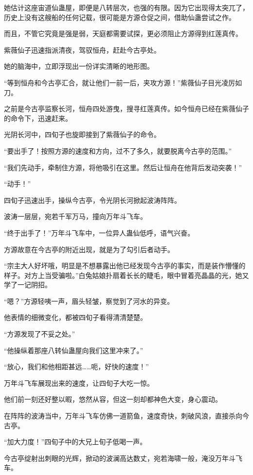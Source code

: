 \begin{this_body}
她估计这座宙道仙蛊屋，即便是八转层次，也强的有限。因为它出现得太突兀了，历史上没有这艘船的任何记载，很可能是方源仓促之间，借助仙蛊尝试之作。

而且，不管它究竟是强是弱，天庭都需要试探，更必须阻止方源得到红莲真传。

紫薇仙子迅速指派清夜，驾驭恒舟，赶赴今古亭处。

她的脑海中，立即浮现出一份详实清晰的地形图。

“等到恒舟和今古亭汇合，就让他们一前一后，夹攻方源！”紫薇仙子目光凌厉如刀。

之前是今古亭监察长河，恒舟四处游曳，搜寻红莲真传。如今恒舟已经在紫薇仙子的命令下，迅速赶来。

光阴长河中，四旬子也旋即接到了紫薇仙子的命令。

“要出手了！按照方源的速度和方向，过不了多久，就要脱离今古亭的范围。”

“我们先动手，牵制住方源，将他吸引在这里。然后让恒舟在他背后发动突袭！”

“动手！”

四旬子迅速出手，操纵今古亭，令光阴长河掀起波涛阵阵。

波涛一层层，宛若千军万马，撞向万年斗飞车。

“终于出手了！”万年斗飞车中，一位异人蛊仙低呼，语气兴奋。

方源故意在今古亭的附近出现，就是为了勾引后者动手。

“宗主大人好坏哦，明显是不想暴露出他已经发现今古亭的事实，而是装作懵懂的样子。对方上当受骗啦。”白兔姑娘扑扇着长长的睫毛，眼中冒着亮晶晶的光，她又学了一记阴招。

“嗯？”方源轻咦一声，眉头轻皱，察觉到了河水的异变。

他表情的细微变化，都被四旬子看得清清楚楚。

“方源发现了不妥之处。”

“他操纵着那座八转仙蛊屋向我们这里冲来了。”

“放心，我们和他相距甚远……呃，好快的速度！”

万年斗飞车展现出来的速度，让四旬子大吃一惊。

他们前一刻还好整以暇，悠然从容，但这一刻却都神色大变，身心震动。

在阵阵的波涛当中，万年斗飞车仿佛一道箭鱼，速度奇快，刺破风浪，直接杀向今古亭。

“加大力度！”四旬子中的大兄上旬子低喝一声。

今古亭绽射出刺眼的光辉，掀动的波澜高达数丈，宛若海啸一般，淹没万年斗飞车。


\end{this_body}

